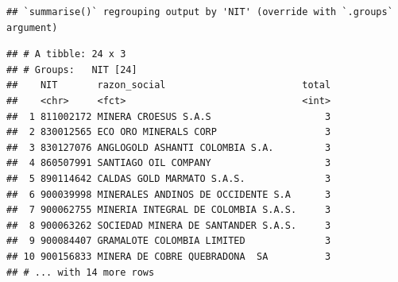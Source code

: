 \documentclass[
  11pt,
]{article}
\newenvironment{Shaded}{\begin{snugshade}}{\end{snugshade}}
\newcommand{\DataTypeTok}[1]{\textcolor[rgb]{0.13,0.29,0.53}{#1}}
\newcommand{\DecValTok}[1]{\textcolor[rgb]{0.00,0.00,0.81}{#1}}
\newcommand{\KeywordTok}[1]{\textcolor[rgb]{0.13,0.29,0.53}{\textbf{#1}}}
\newcommand{\NormalTok}[1]{#1}
\newcommand{\OperatorTok}[1]{\textcolor[rgb]{0.81,0.36,0.00}{\textbf{#1}}}
\newcommand{\StringTok}[1]{\textcolor[rgb]{0.31,0.60,0.02}{#1}}
\begin{document}
\begin{verbatim}
## `summarise()` regrouping output by 'NIT' (override with `.groups` argument)
\end{verbatim}

\begin{verbatim}
## # A tibble: 24 x 3
## # Groups:   NIT [24]
##    NIT       razon_social                        total
##    <chr>     <fct>                               <int>
##  1 811002172 MINERA CROESUS S.A.S                    3
##  2 830012565 ECO ORO MINERALS CORP                   3
##  3 830127076 ANGLOGOLD ASHANTI COLOMBIA S.A.         3
##  4 860507991 SANTIAGO OIL COMPANY                    3
##  5 890114642 CALDAS GOLD MARMATO S.A.S.              3
##  6 900039998 MINERALES ANDINOS DE OCCIDENTE S.A      3
##  7 900062755 MINERIA INTEGRAL DE COLOMBIA S.A.S.     3
##  8 900063262 SOCIEDAD MINERA DE SANTANDER S.A.S.     3
##  9 900084407 GRAMALOTE COLOMBIA LIMITED              3
## 10 900156833 MINERA DE COBRE QUEBRADONA  SA          3
## # ... with 14 more rows
\end{verbatim}

\begin{Shaded}
\end{Shaded}
\end{document}
